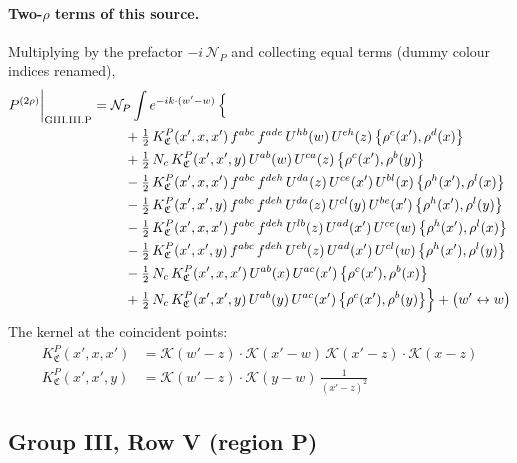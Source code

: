 \documentclass[10pt]{article}
\numberwithin{equation}{section}
\newcommand{\KK}{\mathcal K}
\newcommand{\NP}{\mathcal N_{P}}
\begin{document}
\paragraph{Two-$\rho$ terms of this source.} Multiplying by the prefactor $-i\,\NP$ and collecting equal terms (dummy colour indices renamed),
\begin{align}
P^{(2\rho)}\bigg|_{\rm GIII.III.P}={}&\NP\int e^{-ik\cdot(w'-w)}\,\Big\{\notag\\
&\quad +\tfrac12\,K^{P}_{\mathfrak C}(x',x,x')\,f^{abc}\,f^{ade}\,U^{hb}(w)\,U^{eh}(z)\,\big\{\rho^{c}(x'),\rho^{d}(x)\big\}\notag\\
&\quad +\tfrac12\,N_{c}\,K^{P}_{\mathfrak C}(x',x',y)\,U^{ab}(w)\,U^{ca}(z)\,\big\{\rho^{c}(x'),\rho^{b}(y)\big\}\notag\\
&\quad -\tfrac12\,K^{P}_{\mathfrak C}(x',x,x')\,f^{abc}\,f^{deh}\,U^{da}(z)\,U^{ce}(x')\,U^{bl}(x)\,\big\{\rho^{h}(x'),\rho^{l}(x)\big\}\notag\\
&\quad -\tfrac12\,K^{P}_{\mathfrak C}(x',x',y)\,f^{abc}\,f^{deh}\,U^{da}(z)\,U^{cl}(y)\,U^{be}(x')\,\big\{\rho^{h}(x'),\rho^{l}(y)\big\}\notag\\
&\quad -\tfrac12\,K^{P}_{\mathfrak C}(x',x,x')\,f^{abc}\,f^{deh}\,U^{lb}(z)\,U^{ad}(x')\,U^{ce}(w)\,\big\{\rho^{h}(x'),\rho^{l}(x)\big\}\notag\\
&\quad -\tfrac12\,K^{P}_{\mathfrak C}(x',x',y)\,f^{abc}\,f^{deh}\,U^{eb}(z)\,U^{ad}(x')\,U^{cl}(w)\,\big\{\rho^{h}(x'),\rho^{l}(y)\big\}\notag\\
&\quad -\tfrac12\,N_{c}\,K^{P}_{\mathfrak C}(x',x,x')\,U^{ab}(x)\,U^{ac}(x')\,\big\{\rho^{c}(x'),\rho^{b}(x)\big\}\notag\\
&\quad +\tfrac12\,N_{c}\,K^{P}_{\mathfrak C}(x',x',y)\,U^{ab}(y)\,U^{ac}(x')\,\big\{\rho^{c}(x'),\rho^{b}(y)\big\}\Big\}+\big(w'\leftrightarrow w\big)\label{B:eq:res-GIII.III.P}
\end{align}
The kernel at the coincident points:
\begin{align*}
K^{P}_{\mathfrak C}(x',x,x')&=\KK(w'-z)\cdot\KK(x'-w)\,\KK(x'-z)\cdot\KK(x-z)\\K^{P}_{\mathfrak C}(x',x',y)&=\KK(w'-z)\cdot\KK(y-w)\,\frac{1}{(x'-z)^2}
\end{align*}
\subsection{Group III, Row V (region P)}\label{B:sec:GIII.V.P}
\end{document}
